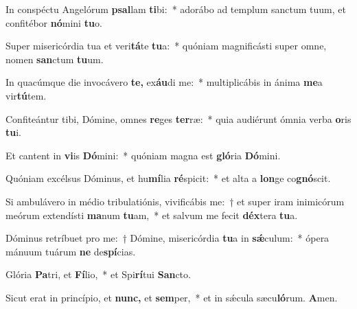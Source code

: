 \item In conspéctu Angelórum \textbf{psal}lam \textbf{ti}bi:~* adorábo ad templum sanctum tuum, et confitébor \textbf{nó}mini \textbf{tu}o.
\item Super misericórdia tua et veri\textbf{tá}te \textbf{tu}a:~* quóniam magnificásti super omne, nomen \textbf{san}ctum \textbf{tu}um.
\item In quacúmque die invocávero \textbf{te,} ex\textbf{áu}di me:~* multiplicábis in ánima \textbf{me}a vir\textbf{tú}tem.
\item Confiteántur tibi, Dómine, omnes \textbf{re}ges \textbf{ter}ræ:~* quia audiérunt ómnia verba \textbf{o}ris \textbf{tu}i.
\item Et cantent in \textbf{vi}is \textbf{Dó}mini:~* quóniam magna est \textbf{gló}ria \textbf{Dó}mini.
\item Quóniam excélsus Dóminus, et hu\textbf{mí}lia \textbf{ré}spicit:~* et alta a \textbf{lon}ge co\textbf{gnó}scit.
\item Si ambulávero in médio tribulatiónis, vivificábis me:~† et super iram inimicórum meórum extendísti \textbf{ma}num \textbf{tu}am,~* et salvum me fecit \textbf{déx}tera \textbf{tu}a.
\item Dóminus retríbuet pro me:~† Dómine, misericórdia \textbf{tu}a in \textbf{sǽ}culum:~* ópera mánuum tuárum \textbf{ne} de\textbf{spí}cias.
\item Glória \textbf{Pa}tri, et \textbf{Fí}lio,~* et Spi\textbf{rí}tui \textbf{San}cto.
\item Sicut erat in princípio, et \textbf{nunc,} et \textbf{sem}per,~* et in sǽcula sæcu\textbf{ló}rum. \textbf{A}men.